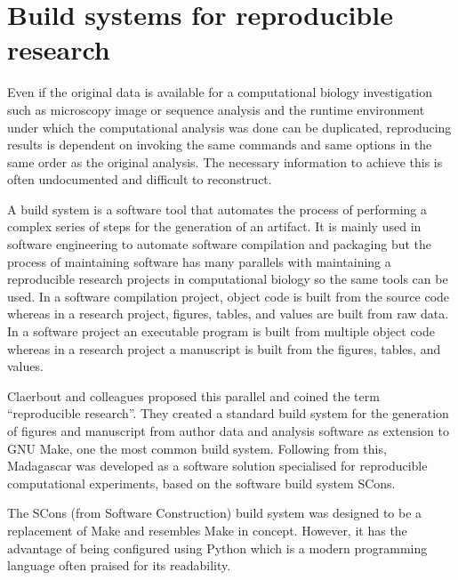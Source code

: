 \section{Build systems for reproducible research}

Even if the original data is available for a computational biology
investigation such as microscopy image or sequence analysis
and the runtime environment under
which the computational analysis was done can be duplicated, reproducing results
is dependent on invoking the same commands and same
options in the same order as the original analysis.
The necessary information to achieve this is often undocumented
and difficult to reconstruct.

A build system is a software tool that automates the process of
performing a complex series of steps for the generation of an artifact.
It is mainly used in software engineering to automate software
compilation and packaging
but the process of maintaining software has many parallels with
maintaining a reproducible research projects in computational biology
so the same tools
can be used.  In a software compilation project, object code is built from the
source code whereas in a research project, figures, tables, and values
are built from raw
data.  In a software project an executable program is built from multiple
object code whereas in a research project a manuscript is built from the
figures, tables, and values.

Claerbout and colleagues \citep{ReDoc-claerbout} proposed this
parallel and
coined the term ``reproducible research''.  They created a standard
build system for the generation of figures and manuscript from author
data and analysis software as extension to GNU
Make, one the most common build system.  Following from this,
Madagascar \citep{madagascar-scons} was developed as a
software solution specialised
for reproducible computational experiments, based on the software
build system SCons.

The SCons (from Software Construction) build
system \citep{scons} was designed to be a
replacement of Make and resembles Make in concept.  However, it has
the advantage of being configured using Python which is a modern
programming language often praised for its readability.


